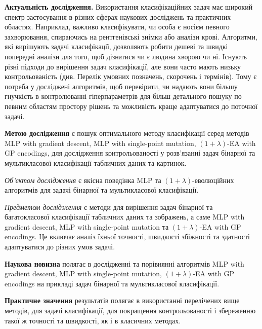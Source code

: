 \textbf{Актуальність дослідження.} Використання класифікаційних задач має широкий спектр застосування в різних сферах наукових досліджень та практичних областях. Наприклад, важливо класифікувати, чи особа є носієм певного захворювання, спираючись на рентгенівські знімки або аналізи крові. Алгоритми, які вирішують задачі класифікації, дозволяють робити дешеві та швидкі попередні аналізи для того, щоб дізнатися чи є людина хворою чи ні. Існують різні підходи до вирішення задач класифікації, але вони часто мають низьку контрольованість (див. Перелік умовних позначень, скорочень і термінів). Тому є потреба у досліджені алгоритмів, щоб перевірити, чи надають вони більшу гнучкість в контролюванні гіперпараметрів для більш детального пошуку по певним областям простору рішень та можливість краще адаптуватися до поточної задачі.

\textbf{Метою дослідження} є пошук оптимального методу класифікації серед методів MLP with gradient descent, MLP with single-point mutation, $(1+\lambda)$-EA with GP encodings, для дослідження контрольованості у розв'язанні задач бінарної та мультикласової класифікації табличних даних та картинок.

\emph{Об'єктом дослідження} є якісна поведінка MLP та $(1+\lambda)$-еволюційних алгоритмів для задачі бінарної та мультикласової класифікації.

\emph{Предметом дослідження} є методи для вирішення задач бінарної та багатокласової класифікації табличних даних та зображень, а саме MLP with gradient descent, MLP with single-point mutation та $(1+\lambda)$-EA with GP encodings. Це включає аналіз їхньої точності, швидкості збіжності та здатності адаптуватися до різних умов задачі.

\textbf{Наукова новизна} полягає в дослідженні та порівнянні алгоритмів MLP with gradient descent, MLP with single-point mutation, $(1+\lambda)$-EA with GP encodings на прикладі задач бінарної та мультикласової класифікації.

\textbf{Практичне значення} результатів полягає в використанні перелічених вище методів, для задачі класифікації, для покращення контрольованості і збереженню такої ж точності та швидкості, як і в класичних методах.